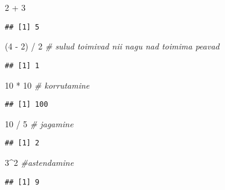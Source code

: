 \documentclass[
]{book}
\newenvironment{Shaded}{\begin{snugshade}}{\end{snugshade}}
\newcommand{\CommentTok}[1]{\textcolor[rgb]{0.56,0.35,0.01}{\textit{#1}}}
\newcommand{\DecValTok}[1]{\textcolor[rgb]{0.00,0.00,0.81}{#1}}
\newcommand{\NormalTok}[1]{#1}
\newcommand{\SpecialCharTok}[1]{\textcolor[rgb]{0.00,0.00,0.00}{#1}}
\begin{document}
\begin{Shaded}
\begin{Highlighting}[]
\DecValTok{2} \SpecialCharTok{+} \DecValTok{3}
\end{Highlighting}
\end{Shaded}

\begin{verbatim}
## [1] 5
\end{verbatim}

\begin{Shaded}
\begin{Highlighting}[]
\NormalTok{(}\DecValTok{4} \SpecialCharTok{{-}} \DecValTok{2}\NormalTok{) }\SpecialCharTok{/} \DecValTok{2} \CommentTok{\# sulud toimivad nii nagu nad toimima peavad}
\end{Highlighting}
\end{Shaded}

\begin{verbatim}
## [1] 1
\end{verbatim}

\begin{Shaded}
\begin{Highlighting}[]
\DecValTok{10} \SpecialCharTok{*} \DecValTok{10} \CommentTok{\# korrutamine}
\end{Highlighting}
\end{Shaded}

\begin{verbatim}
## [1] 100
\end{verbatim}

\begin{Shaded}
\begin{Highlighting}[]
\DecValTok{10} \SpecialCharTok{/} \DecValTok{5} \CommentTok{\# jagamine}
\end{Highlighting}
\end{Shaded}

\begin{verbatim}
## [1] 2
\end{verbatim}

\begin{Shaded}
\begin{Highlighting}[]
\DecValTok{3}\SpecialCharTok{\^{}}\DecValTok{2} \CommentTok{\#astendamine}
\end{Highlighting}
\end{Shaded}

\begin{verbatim}
## [1] 9
\end{verbatim}
\end{document}
